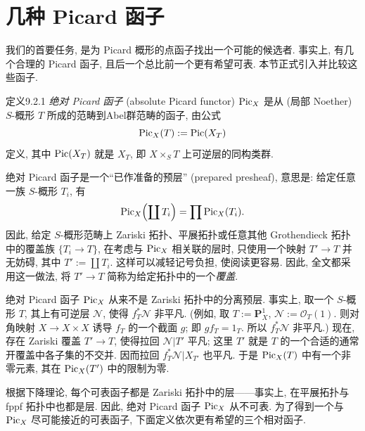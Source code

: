 \section{几种 Picard 函子}
\label{ch09s02:section}
\begingroup
\def\PZ{\Pic_{(X/S)(\mathrm{zar})}}
\def\PE{\Pic_{(X/S)(\text{ét})}}
\def\PF{\Pic_{(X/S)(\mathrm{fppf})}}
\def\PQ{\Pic_{(X/S)(\mathrm{fpqc})}}
\def\L{\mathcal L}\def\M{\mathcal M}\def\N{\mathcal N}
\def\sHom{\mathcal H\!om}

我们的首要任务, 是为 Picard 概形的点函子找出一个可能的候选者. 事实上, 有几个合理的 Picard 函子, 且后一个总比前一个更有希望可表. 本节正式引入并比较这些函子.

\begin{origstatement}{定义}{9.2.1}\label{ch09s02:def921}
\emph{绝对 Picard 函子} (absolute Picard functor) $\operatorname{Pic}_X$ 是从 (局部 Noether) $S$-概形 $T$ 所成的范畴到Abel群范畴的函子, 由公式
\[
\operatorname{Pic}_X(T):=\operatorname{Pic}(X_T)
\]
定义, 其中 $\operatorname{Pic}(X_T)$ 就是 $X_T$, 即 $X\times_ST$ 上可逆层的同构类群.
\end{origstatement}

绝对 Picard 函子是一个“已作准备的预层” (prepared presheaf), 意思是: 给定任意一族 $S$-概形 $T_i$, 有
\[
\operatorname{Pic}_X\Bigl(\coprod T_i\Bigr)=\prod\operatorname{Pic}_X(T_i).
\]
因此, 给定 $S$-概形范畴上 Zariski 拓扑、平展拓扑或任意其他 Grothendieck 拓扑中的覆盖族 $\{T_i\to T\}$, 在考虑与 $\operatorname{Pic}_X$ 相关联的层时, 只使用一个映射 $T'\to T$ 并无妨碍, 其中 $T':=\coprod T_i$. 这样可以减轻记号负担, 使阅读更容易. 因此, 全文都采用这一做法, 将 $T'\to T$ 简称为给定拓扑中的一个\emph{覆盖}.

绝对 Picard 函子 $\operatorname{Pic}_X$ 从来不是 Zariski 拓扑中的分离预层. 事实上, 取一个 $S$-概形 $T$, 其上有可逆层 $\N$, 使得 $f_T^*\N$ 非平凡. (例如, 取 $T:=\mathbf P_X^1$, $\N:=\mathcal O_T(1)$. 则对角映射 $X\to X\times X$ 诱导 $f_T$ 的一个截面 $g$; 即 $gf_T=1_T$. 所以 $f_T^*\N$ 非平凡.) 现在, 存在 Zariski 覆盖 $T'\to T$, 使得拉回 $\N|T'$ 平凡; 这里 $T'$ 就是 $T$ 的一个合适的通常开覆盖中各子集的不交并. 因而拉回 $f_T^*\N|X_{T'}$ 也平凡. 于是 $\operatorname{Pic}_X(T)$ 中有一个非零元素, 其在 $\operatorname{Pic}_X(T')$ 中的限制为零.

根据下降理论, 每个可表函子都是 Zariski 拓扑中的层——事实上, 在平展拓扑与 fppf 拓扑中也都是层. 因此, 绝对 Picard 函子 $\operatorname{Pic}_X$ 从不可表. 为了得到一个与 $\operatorname{Pic}_X$ 尽可能接近的可表函子, 下面定义依次更有希望的三个相对函子.

